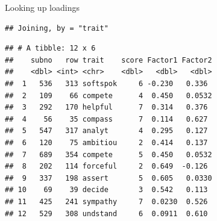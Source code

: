 \documentclass[
  ignorenonframetext,
]{beamer}
\newenvironment{Shaded}{\begin{snugshade}}{\end{snugshade}}
\newcommand{\DecValTok}[1]{\textcolor[rgb]{0.00,0.00,0.81}{#1}}
\newcommand{\KeywordTok}[1]{\textcolor[rgb]{0.13,0.29,0.53}{\textbf{#1}}}
\newcommand{\NormalTok}[1]{#1}
\newcommand{\OperatorTok}[1]{\textcolor[rgb]{0.81,0.36,0.00}{\textbf{#1}}}
\newcommand{\StringTok}[1]{\textcolor[rgb]{0.31,0.60,0.02}{#1}}
\begin{document}
\begin{frame}[fragile]{Looking up loadings}
\protect\hypertarget{looking-up-loadings}{}

\scriptsize

\begin{Shaded}
\end{Shaded}

\begin{verbatim}
## Joining, by = "trait"
\end{verbatim}

\begin{Shaded}
\end{Shaded}

\begin{verbatim}
## # A tibble: 12 x 6
##    subno   row trait    score Factor1 Factor2
##    <dbl> <int> <chr>    <dbl>   <dbl>   <dbl>
##  1   536   313 softspok     6 -0.230   0.336 
##  2   109    66 compete      4  0.450   0.0532
##  3   292   170 helpful      7  0.314   0.376 
##  4    56    35 compass      7  0.114   0.627 
##  5   547   317 analyt       4  0.295   0.127 
##  6   120    75 ambitiou     2  0.414   0.137 
##  7   689   354 compete      5  0.450   0.0532
##  8   202   114 forceful     2  0.649  -0.126 
##  9   337   198 assert       5  0.605   0.0330
## 10    69    39 decide       3  0.542   0.113 
## 11   425   241 sympathy     7  0.0230  0.526 
## 12   529   308 undstand     6  0.0911  0.610
\end{verbatim}

\normalsize

\end{frame}
\end{document}
